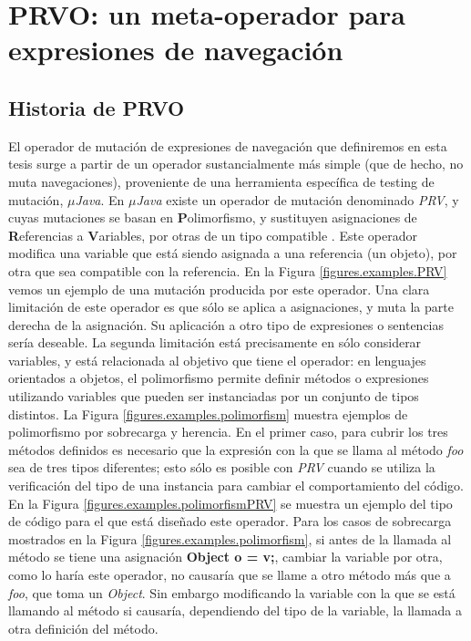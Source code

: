 \chapter[PRVO]{PRVO: un meta-operador para expresiones de navegaci\'on}
\label{cap:prvo}

\section{Historia de PRVO}
\label{sec:prvo.history}
El operador de mutaci\'on de expresiones de navegaci\'on que definiremos en esta tesis surge a partir de un operador sustancialmente m\'as simple (que de hecho, no muta navegaciones), proveniente de una herramienta espec\'ifica de testing de mutaci\'on, \emph{$\mu$Java}. En \emph{$\mu$Java} existe un operador de mutaci\'on denominado \emph{PRV}, y cuyas mutaciones se basan en \textbf{P}olimorfismo, y sustituyen asignaciones de \textbf{R}eferencias a \textbf{V}ariables, por otras de un tipo compatible \cite{muJavaCOPS, bibliography.mutation.operators.MaKO02}. Este operador modifica una variable que est\'a siendo asignada a una referencia (un objeto), por otra que sea compatible con la referencia. En la Figura \ref{figures.examples.PRV} vemos un ejemplo de una mutaci\'on producida por este operador. Una clara limitaci\'on de este operador es que s\'olo se aplica a asignaciones, y muta la parte derecha de la asignaci\'on. Su aplicaci\'on a otro tipo de expresiones o sentencias ser\'ia deseable. La segunda limitaci\'on est\'a precisamente en s\'olo considerar variables, y est\'a relacionada al objetivo que tiene el operador: en lenguajes orientados a objetos, el polimorfismo permite definir m\'etodos o expresiones utilizando variables que pueden ser instanciadas por un conjunto de tipos distintos. La Figura \ref{figures.examples.polimorfism} muestra ejemplos de polimorfismo por sobrecarga y herencia. En el primer caso, para cubrir los tres m\'etodos definidos es necesario que la expresi\'on con la que se llama al m\'etodo \emph{foo} sea de tres tipos diferentes; esto s\'olo es posible con \emph{PRV} cuando se utiliza la verificaci\'on del tipo de una instancia para cambiar el comportamiento del c\'odigo. En la Figura \ref{figures.examples.polimorfismPRV} se muestra un ejemplo del tipo de c\'odigo para el que est\'a dise\~nado este operador. Para los casos de sobrecarga mostrados en la Figura \ref{figures.examples.polimorfism}, si antes de la llamada al m\'etodo se tiene una asignaci\'on \textbf{Object o = v;}, cambiar la variable por otra, como lo har\'ia este operador, no causar\'ia que se llame a otro m\'etodo m\'as que a \emph{foo}, que toma un \emph{Object}. Sin embargo modificando la variable con la que se est\'a llamando al m\'etodo si causar\'ia, dependiendo del tipo de la variable, la llamada a otra definici\'on del m\'etodo. 

